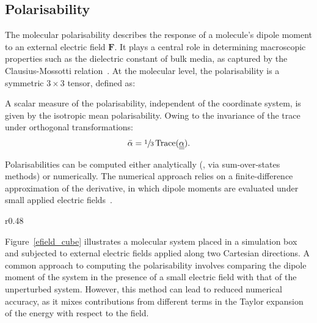 \subsection{Polarisability}

The molecular polarisability describes the response of a molecule's dipole moment
to an external electric field $\mathbf{F}$. It plays a central role in determining
macroscopic properties such as the dielectric constant of bulk media, as captured
by the Clausius-Mossotti relation~\cite{landau2013electrodynamics}. At the
molecular level, the polarisability is a symmetric
$3 \times 3$ tensor, defined as:
%

\newpage
A scalar measure of the polarisability, independent of the coordinate
system, is given by the isotropic mean polarisability. Owing to the invariance
of the trace under orthogonal transformations:
%
\begin{align}
  \bar{\alpha} = \sfrac{1}{3}\, \text{Trace}(\underline{\underline{\alpha}}).
\end{align}


Polarisabilities can be computed either analytically (\eg, via sum-over-states
methods) or numerically. The numerical approach relies on a finite-difference
approximation of the derivative, in which dipole moments are evaluated under
small applied electric fields~\cite{DosSantos2015}.

\begin{wrapfigure}{r}{0.48\textwidth}
  \centering
  
  \caption{System in a box, subjected to an external electric field in $x$-axis
           and $z$-axis.} 
  \label{efield_cube}
\end{wrapfigure}

\vspace{1em}%
Figure~\ref{efield_cube} illustrates a molecular system placed in a simulation
box and subjected to external electric fields applied along two Cartesian
directions. A common approach to computing the polarisability involves
comparing the dipole moment of the system in the presence of a small electric
field with that of the unperturbed system. However, this method can lead to
reduced numerical accuracy, as it mixes contributions from different terms in
the Taylor expansion of the energy with respect to the field.

